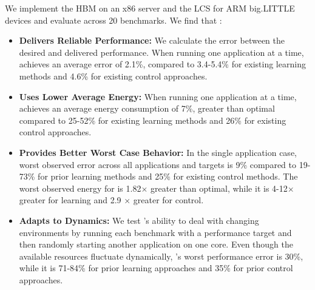 We implement the HBM on an x86 server and the LCS for ARM big.LITTLE
devices and evaluate across 20 benchmarks.  We find that \SYSTEM{}:
\begin{itemize}
\item \textbf{Delivers Reliable Performance: } We calculate the error
  between the desired and delivered performance.  When running one
  application at a time, \SYSTEM{} achieves an average error of 2.1\%,
  compared to 3.4-5.4\% for existing learning methods and 4.6\% for
  existing control approaches.
\item \textbf{Uses Lower Average Energy:} When running one application
  at a time, \SYSTEM{} achieves an average energy consumption of 7\%,
  greater than optimal compared to 25-52\% for existing learning
  methods and 26\% for existing control approaches.
\item \textbf{Provides Better Worst Case Behavior:} In the single
  application case, \SYSTEM{} worst observed error across all
  applications and targets is 9\% compared to 19-73\% for prior
  learning methods and 25\% for existing control methods.  The worst
  observed energy for \SYSTEM{} is 1.82$\times$ greater than optimal,
  while it is 4-12$\times$ greater for learning and 2.9 $\times$
  greater for control.
\item \textbf{Adapts to Dynamics:} We test \SYSTEM{}'s ability to deal
  with changing environments by running each benchmark with a
  performance target and then randomly starting another application on
  one core.  Even though the available resources fluctuate
  dynamically, \SYSTEM{}'s worst performance error is 30\%, while it
  is 71-84\% for prior learning approaches and 35\% for prior control
  approaches.
\end{itemize}
